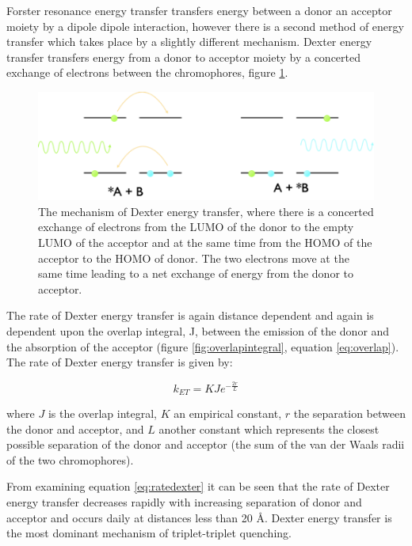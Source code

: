 \documentclass[
]{book}
\begin{document}
Forster resonance energy transfer transfers energy between a donor an acceptor moiety by a dipole dipole interaction, however there is a second method of energy transfer which takes place by a slightly different mechanism. Dexter energy transfer transfers energy from a donor to acceptor moiety by a concerted exchange of electrons between the chromophores, figure \ref{fig:Dexter}.

\begin{figure}

{\centering \includegraphics[width=0.7\linewidth]{images/Dexter} 

}

\caption{ The mechanism of Dexter energy transfer, where there is a concerted exchange of electrons from the LUMO of the donor to the empty LUMO of the acceptor and at the same time from the HOMO of the acceptor to the HOMO of donor. The two electrons move at the same time leading to a net exchange of energy from the donor to acceptor.}\label{fig:Dexter}
\end{figure}

The rate of Dexter energy transfer is again distance dependent and again is dependent upon the overlap integral, J, between the emission of the donor and the absorption of the acceptor (figure \ref{fig:overlapintegral}, equation \eqref{eq:overlap}). The rate of Dexter energy transfer is given by:

\begin{equation}
k_{ET}=KJe^{-\frac{2r}{L}}
\label{eq:ratedexter}
\end{equation}

where \(J\) is the overlap integral, \(K\) an empirical constant, \(r\) the separation between the donor and acceptor, and \(L\) another constant which represents the closest possible separation of the donor and acceptor (the sum of the van der Waals radii of the two chromophores).

From examining equation \eqref{eq:ratedexter} it can be seen that the rate of Dexter energy transfer decreases rapidly with increasing separation of donor and acceptor and occurs daily at distances less than 20 Å. Dexter energy transfer is the most dominant mechanism of triplet-triplet quenching.
\end{document}
